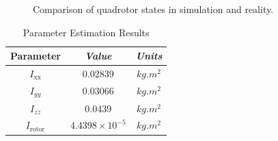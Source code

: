 \documentclass[conference]{IEEEtran}
\begin{document}
\begin{figure}[!h]
	\centering
	\hfil
	\hfil
	\caption{Comparison of quadrotor states in simulation and reality.} \label{fig_sim}
\end{figure}


\begin{table}[!h]
	\renewcommand{\arraystretch}{1.3}
	\caption{Parameter Estimation Results}
	\begin{center}
	\begin{tabular}{c c c}
	\hline
	\textbf{Parameter} & \textbf{\textit{Value}}& \textbf{\textit{Units}} \\
	\hline
	$I_{\text{xx}}$ & $0.02839$ & $kg.m^2$ \\
	$I_{yy}$  & $0.03066$ & $kg.m^2$\\
	$I_{zz}$  & $0.0439$ & $kg.m^2$ \\
	$I_{\text{rotor}}$  & $4.4398\times 10^{-5}$ & $kg.m^2$\\
	\hline
	\end{tabular}
	\label{tab1}
	\end{center}
\end{table}
\end{document}
